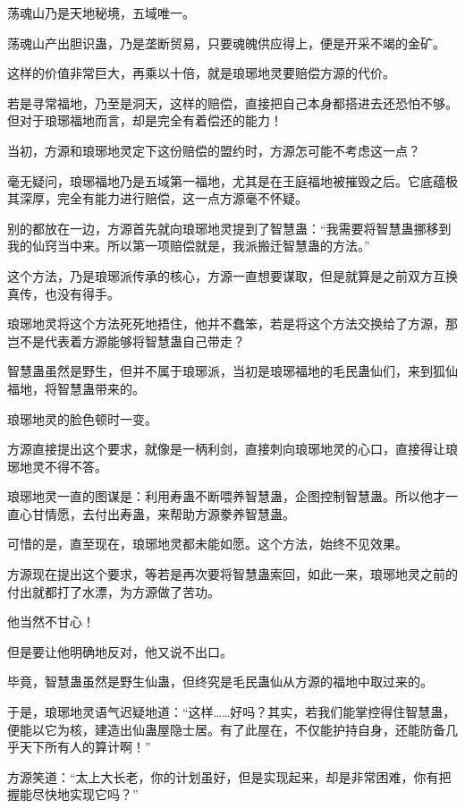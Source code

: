 
\begin{this_body}

荡魂山乃是天地秘境，五域唯一。

荡魂山产出胆识蛊，乃是垄断贸易，只要魂魄供应得上，便是开采不竭的金矿。

这样的价值非常巨大，再乘以十倍，就是琅琊地灵要赔偿方源的代价。

若是寻常福地，乃至是洞天，这样的赔偿，直接把自己本身都搭进去还恐怕不够。但对于琅琊福地而言，却是完全有着偿还的能力！

当初，方源和琅琊地灵定下这份赔偿的盟约时，方源怎可能不考虑这一点？

毫无疑问，琅琊福地乃是五域第一福地，尤其是在王庭福地被摧毁之后。它底蕴极其深厚，完全有能力进行赔偿，这一点方源毫不怀疑。

别的都放在一边，方源首先就向琅琊地灵提到了智慧蛊：“我需要将智慧蛊挪移到我的仙窍当中来。所以第一项赔偿就是，我派搬迁智慧蛊的方法。”

这个方法，乃是琅琊派传承的核心，方源一直想要谋取，但是就算是之前双方互换真传，也没有得手。

琅琊地灵将这个方法死死地捂住，他并不蠢笨，若是将这个方法交换给了方源，那岂不是代表着方源能够将智慧蛊自己带走？

智慧蛊虽然是野生，但并不属于琅琊派，当初是琅琊福地的毛民蛊仙们，来到狐仙福地，将智慧蛊带来的。

琅琊地灵的脸色顿时一变。

方源直接提出这个要求，就像是一柄利剑，直接刺向琅琊地灵的心口，直接得让琅琊地灵不得不答。

琅琊地灵一直的图谋是：利用寿蛊不断喂养智慧蛊，企图控制智慧蛊。所以他才一直心甘情愿，去付出寿蛊，来帮助方源豢养智慧蛊。

可惜的是，直至现在，琅琊地灵都未能如愿。这个方法，始终不见效果。

方源现在提出这个要求，等若是再次要将智慧蛊索回，如此一来，琅琊地灵之前的付出就都打了水漂，为方源做了苦功。

他当然不甘心！

但是要让他明确地反对，他又说不出口。

毕竟，智慧蛊虽然是野生仙蛊，但终究是毛民蛊仙从方源的福地中取过来的。

于是，琅琊地灵语气迟疑地道：“这样……好吗？其实，若我们能掌控得住智慧蛊，便能以它为核，建造出仙蛊屋隐士居。有了此屋在，不仅能护持自身，还能防备几乎天下所有人的算计啊！”

方源笑道：“太上大长老，你的计划虽好，但是实现起来，却是非常困难，你有把握能尽快地实现它吗？”


\end{this_body}
